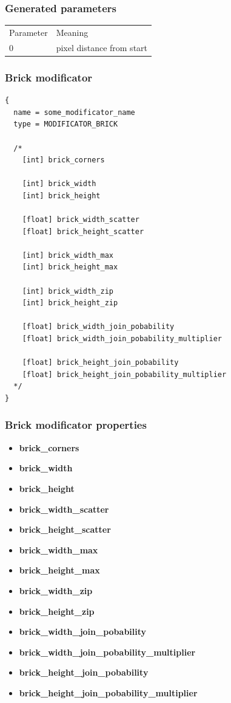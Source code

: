 \documentclass[9pt]{article}
\begin{document}
\subsubsection*{Generated parameters}

\begin{tabular}{|l||l|}
  Parameter & Meaning \\
  0 & pixel distance from start \\
\end{tabular}

\subsubsection{Brick modificator}

\begin{verbatim}
{
  name = some_modificator_name
  type = MODIFICATOR_BRICK

  /*
    [int] brick_corners
        
    [int] brick_width
    [int] brick_height
        
    [float] brick_width_scatter
    [float] brick_height_scatter
        
    [int] brick_width_max
    [int] brick_height_max
        
    [int] brick_width_zip
    [int] brick_height_zip
        
    [float] brick_width_join_pobability
    [float] brick_width_join_pobability_multiplier
        
    [float] brick_height_join_pobability
    [float] brick_height_join_pobability_multiplier
  */
}
\end{verbatim}
\subsubsection*{Brick modificator properties}
\begin{itemize}
\item{\bf brick\_corners}
\item{\bf brick\_width}
\item{\bf brick\_height}
\item{\bf brick\_width\_scatter}
\item{\bf brick\_height\_scatter}
\item{\bf brick\_width\_max}
\item{\bf brick\_height\_max}
\item{\bf brick\_width\_zip}
\item{\bf brick\_height\_zip}
\item{\bf brick\_width\_join\_pobability}
\item{\bf brick\_width\_join\_pobability\_multiplier}
\item{\bf brick\_height\_join\_pobability}
\item{\bf brick\_height\_join\_pobability\_multiplier}
\end{itemize}
\end{document}
